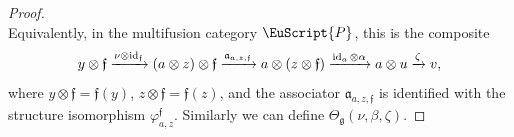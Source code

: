 \documentclass[a4paper,11pt]{article}
\theoremstyle{definition}
\theoremstyle{remark}
\newcommand\eP         {\EuScript{P}}
\newcommand{\id}{\operatorname{id}}
\begin{document}
\begin{proof}
\begin{equation}
    \end{equation}
    Equivalently, in the multifusion category $\eP$, this is the     composite
    \begin{equation}
        \notag
        y\otimes\mathfrak f
        \xrightarrow{\nu\otimes\id_{\mathfrak f}}
        (a\otimes z)\otimes\mathfrak f
        \xrightarrow{\mathfrak a_{a,z,\mathfrak f}}
        a\otimes(z\otimes\mathfrak f)
        \xrightarrow{\id_a\otimes\alpha}
        a\otimes u
        \xrightarrow{\zeta}
        v, 
    \end{equation}
    where $y\otimes\mathfrak f=\mathfrak f(y)$, $z\otimes\mathfrak f=\mathfrak f(z)$, and the associator
    $\mathfrak a_{a,z,\mathfrak f}$ is identified with the structure isomorphism $\varphi^{\mathfrak f}_{a,z}$. Similarly we can define $\Theta_{\mathfrak g} (\nu,\beta,\zeta)$. 



\end{proof}
\end{document}
